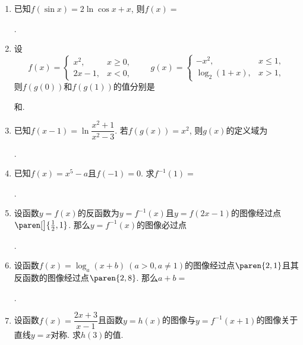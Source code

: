 \documentclass[a4paper,punct=CCT]{ctexbook}
\theoremstyle{break}
\newif\ifshowsol
\let\leq\leqslant
\let\le\leq
\let\geq\geqslant
\let\ge\geq}
\begin{document}
\begin{enumerate}
\item 已知\(f(\sin x) = 2 \ln \cos x + x\), 则\(f(x) =\)
  \ifshowsol
  \uline{\makebox[20em]{\(f(x) = \ln(1-x^2) + 2k\pi + \arcsin x,\ k \in \Z\)}}.
  \else
  \uline{\makebox[20em]{}}.
  \fi

\item 设
  \[
    f(x) =
    \begin{cases}
      x^2, & x \ge 0, \\
      2x - 1, & x < 0,
    \end{cases}
    \qquad
    g(x) =
    \begin{cases}
      -x^2, & x \le 1, \\
      \log_2(1+x), & x > 1,
    \end{cases}
  \]
  则\(f(g(0))\)和\(f(g(1))\)的值分别是
  \ifshowsol
  \uline{\makebox[3em]{\(0\)}}和\uline{\makebox[3em]{\(-3\)}}.
  \else
  \uline{\makebox[3em]{}}和\uline{\makebox[3em]{}}.
  \fi

\item 已知\(f(x-1) = \ln \dfrac{x^2+1}{x^2-3}\).  若\(f(g(x)) = x^2\), 则\(g(x)\)的定义域为
  \ifshowsol
  \uline{\makebox[10em]{\(\paren{-\infty, 0} \cup \paren{0, +\infty}\)}}.

  实际上, \(g\)是可以求出来的, 就是
  \[
    g(x) = \pm \sqrt{\frac{3e^{x^2}+1}{e^{x^2}-1}} - 1.
  \]
  \else
  \uline{\makebox[10em]{}}.
  \fi

\item 已知\(f(x) = x^5 - a\)且\(f(-1) = 0\).  求\(f^{-1}(1) =\)
  \ifshowsol
  \uline{\makebox[3em]{\(0\)}}.
  \else
  \uline{\makebox[3em]{}}.
  \fi

\item 设函数\(y = f(x)\)的反函数为\(y = f^{-1}(x)\)且\(y = f(2x-1)\)的图像经过点\(\paren[\big]{\frac12, 1}\).  那么\(y = f^{-1}(x)\)的图像必过点
  \ifshowsol
  \uline{\makebox[3em]{\(\paren{1, 0}\)}}.
  \else
  \uline{\makebox[3em]{}}.
  \fi

\item 设函数\(f(x) = \log_a(x+b)\ (a > 0, a \ne 1)\)的图像经过点\(\paren{2,1}\)且其反函数的图像经过点\(\paren{2,8}\).  那么\(a + b =\)
  \ifshowsol
  \uline{\makebox[3em]{\(4\)}}.

  实际上, \(a = 3\)且\(b = 1\).
  \else
  \uline{\makebox[3em]{}}.
  \fi

\item 设函数\(f(x) = \dfrac{2x+3}{x-1}\)且函数\(y = h(x)\)的图像与\(y = f^{-1}(x+1)\)的图像关于直线\(y = x\)对称.  求\(h(3)\)的值.

  \ifshowsol
  这题相当于是求\(3 = f^{-1}(x+1)\)时\(x\)的值.  有\(f(3) = f(\,f^{-1}(x+1)) = x+1 = \dfrac92\), 所以\(h(3) = \dfrac72\).

  实际上, \(h(x) = 1 + \dfrac{5}{x-1}\).
  \fi

\end{enumerate}
\fi
\end{document}
